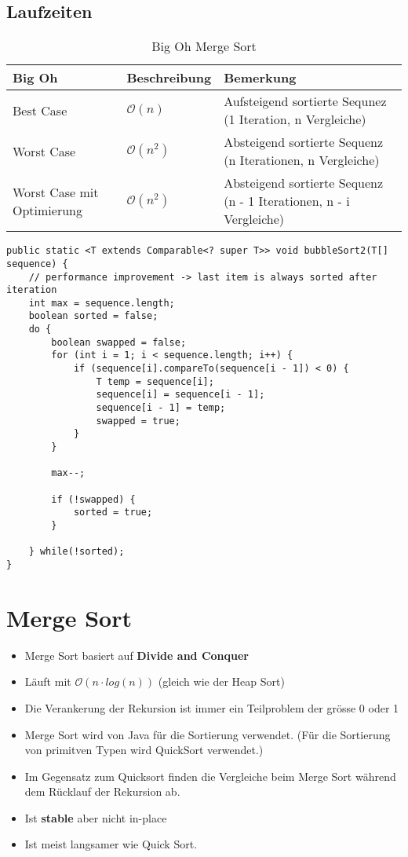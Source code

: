 \subsection{Laufzeiten}
\begin{table}[h]
	\centering
	\begin{tabu} to \linewidth {l l X}
		\toprule
		Big Oh & Beschreibung & Bemerkung \\
		\midrule
		Best Case & $\mathcal{O}(n)$ & Aufsteigend sortierte Sequnez (1 Iteration, n Vergleiche) \\
		Worst Case & $\mathcal{O}(n^2)$ & Absteigend sortierte Sequenz (n Iterationen, n Vergleiche) \\
		Worst Case mit Optimierung & $\mathcal{O}(n^2)$ & Absteigend sortierte Sequenz (n - 1 Iterationen, n - i Vergleiche) \\
		\bottomrule
	\end{tabu}
	\caption{Big Oh Merge Sort}
\end{table}

\begin{lstlisting}[caption=Bubble Sort]
public static <T extends Comparable<? super T>> void bubbleSort2(T[] sequence) {
	// performance improvement -> last item is always sorted after iteration
	int max = sequence.length;
	boolean sorted = false;
	do {
		boolean swapped = false;
		for (int i = 1; i < sequence.length; i++) {
			if (sequence[i].compareTo(sequence[i - 1]) < 0) {
				T temp = sequence[i];
				sequence[i] = sequence[i - 1];
				sequence[i - 1] = temp;
				swapped = true;
			}
		}

		max--;

		if (!swapped) {
			sorted = true;
		}

	} while(!sorted);
}
\end{lstlisting}


\section{Merge Sort}
\begin{itemize}
	\item Merge Sort basiert auf \textbf{Divide and Conquer}
	\item Läuft mit $\mathcal{O}(n \cdot log(n))$ (gleich wie der Heap Sort)
	\item Die Verankerung der Rekursion ist immer ein Teilproblem der grösse 0 oder 1
	\item Merge Sort wird von Java für die Sortierung verwendet. (Für die Sortierung von primitven Typen wird QuickSort verwendet.)
	\item Im Gegensatz zum Quicksort finden die Vergleiche beim Merge Sort während dem Rücklauf der Rekursion ab.
	\item Ist \textbf{stable} aber nicht in-place
	\item Ist meist langsamer wie Quick Sort.
\end{itemize}

